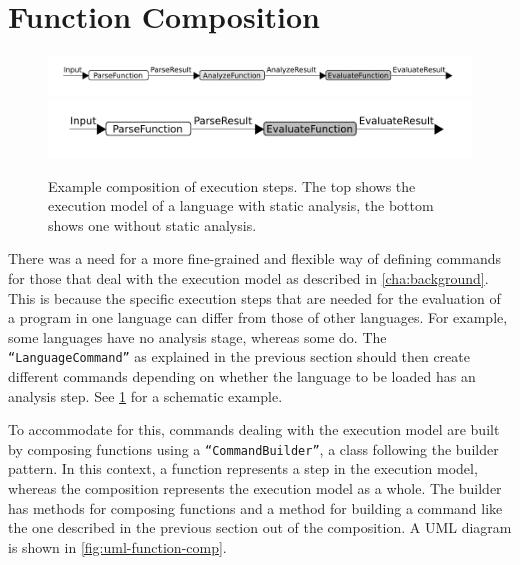 \makeatletter
\Gscale@div\imgscale\textwidth{\wd0}
\makeatother
%
\section{Function Composition}
\label{sec:function-comp}
\begin{figure}[t]
  \includegraphics[scale=\imgscale]{unit-flow}
  \includegraphics[scale=\imgscale]{unit-flow-no-analyze}
  \caption{Example composition of execution steps. The top shows the
    execution model of a language with static analysis,
    the bottom shows one without static analysis. }
  \label{fig:unit-flow}
\end{figure}

There was a need for a more fine-grained and flexible way of defining commands
for those that deal with the execution model as described in
\cref{cha:background}. This is because the specific
execution steps that are needed for the evaluation of a program in one language
can differ from those of other languages. For example, some languages
have no analysis stage, whereas some do. The \texttt{``LanguageCommand''} as
explained in the previous section should then create different
commands depending on whether the language to be loaded has an
analysis step. See \cref{fig:unit-flow} for a schematic example.

To accommodate for this, commands dealing with the execution model are
built by composing functions using a \texttt{``CommandBuilder''}, a class
following the builder pattern. In this context, a function represents a
step in the execution model, whereas the composition represents the
execution model as a whole. The builder has methods for composing
functions and a method for building a command like the one described
in the previous section out of the composition. A UML diagram is shown
in \cref{fig:uml-function-comp}.

